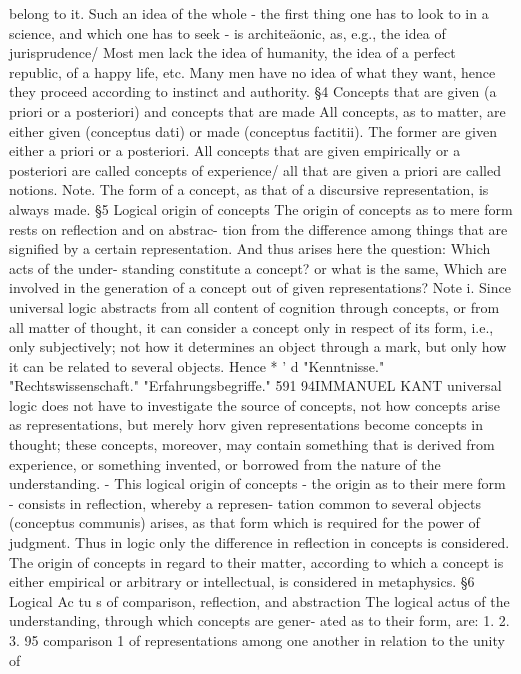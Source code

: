 belong to it. Such an idea of the whole - the first thing one has to look to
in a science, and which one has to seek - is architeäonic, as, e.g., the idea
of jurisprudence/
Most men lack the idea of humanity, the idea of a perfect republic, of a
happy life, etc. Many men have no idea of what they want, hence they
proceed according to instinct and authority.
§4
Concepts that are given (a priori or a posteriori) and concepts
that are made
All concepts, as to matter, are either given (conceptus dati) or made (conceptus
factitii). The former are given either a priori or a posteriori.
All concepts that are given empirically or a posteriori are called concepts of
experience/ all that are given a priori are called notions.
Note.
The form of a concept, as that of a discursive representation, is always
made.
§5
Logical origin of concepts
The origin of concepts as to mere form rests on reflection and on abstrac-
tion from the difference among things that are signified by a certain
representation. And thus arises here the question: Which acts of the under-
standing constitute a concept? or what is the same, Which are involved in the
generation of a concept out of given representations?
Note i. Since universal logic abstracts from all content of cognition through
concepts, or from all matter of thought, it can consider a concept only in
respect of its form, i.e., only subjectively; not how it determines an object
through a mark, but only how it can be related to several objects. Hence
*
'
d
"Kenntnisse."
"Rechtswissenschaft."
"Erfahrungsbegriffe."
591
94IMMANUEL KANT
universal logic does not have to investigate the source of concepts, not how
concepts arise as representations, but merely horv given representations become
concepts in thought; these concepts, moreover, may contain something that
is derived from experience, or something invented, or borrowed from the
nature of the understanding. - This logical origin of concepts - the
origin as to their mere form - consists in reflection, whereby a represen-
tation common to several objects (conceptus communis) arises, as that form
which is required for the power of judgment. Thus in logic only the
difference in reflection in concepts is considered.
The origin of concepts in regard to their matter, according to which a
concept is either empirical or arbitrary or intellectual, is considered in
metaphysics.
§6
Logical Ac tu s of comparison, reflection, and abstraction
The logical actus of the understanding, through which concepts are gener-
ated as to their form, are:
1.
2.
3.
95
comparison 1 of representations among one another in relation to the unity of
